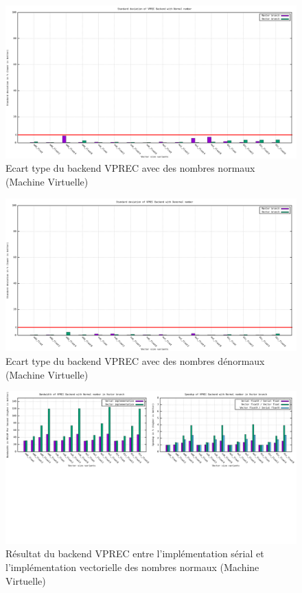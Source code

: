 \documentclass[11pt, letterpaper]{article}
\begin{document}
\label{orgefeadc4}
\begin{figure}[htbp]
\centering
\includegraphics[width=450px]{../ressources/vm_vprec_normal_stddev.png}
\caption{\label{fig:orgca8f423}Ecart type du backend VPREC avec des nombres normaux (Machine Virtuelle)}
\end{figure}

\label{org9344360}
\begin{figure}[htbp]
\centering
\includegraphics[width=450px]{../ressources/vm_vprec_denormal_stddev.png}
\caption{\label{fig:org1115cde}Ecart type du backend VPREC avec des nombres dénormaux (Machine Virtuelle)}
\end{figure}

\label{org8384858}
\begin{figure}[htbp]
\centering
\includegraphics[width=450px]{../ressources/vm_vprec_serial_vs_vector.png}
\caption{\label{fig:orgafabf0b}Résultat du backend VPREC entre l'implémentation sérial et l'implémentation vectorielle des nombres normaux (Machine Virtuelle)}
\end{figure}
\end{document}
